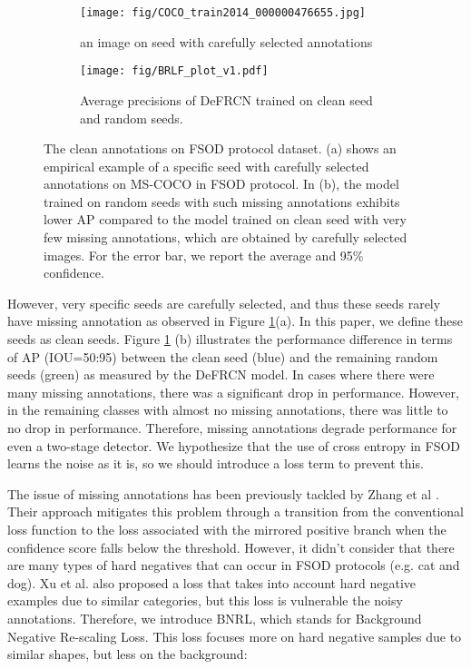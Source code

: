 \documentclass{article}
\begin{document}
\begin{figure}[ht]
    \centering
    \begin{subfigure}[]{0.45\textwidth}
    \texttt{[image: fig/COCO\_train2014\_000000476655.jpg]}
    \caption{an image on seed with carefully selected annotations}
    \end{subfigure}
    \begin{subfigure}[]{0.48\textwidth}
\texttt{[image: fig/BRLF\_plot\_v1.pdf]}
    \caption{Average precisions of DeFRCN trained on clean seed and random seeds.}
    \end{subfigure}
    \caption{
The clean annotations on FSOD protocol dataset. 
(a) shows an empirical example of a specific seed with carefully selected annotations on MS-COCO in FSOD protocol.
In (b), the model trained on random seeds with such missing annotations exhibits lower AP compared to the model trained on clean seed with very few missing annotations, which are obtained by carefully selected images. For the error bar, we report the average and 95\% confidence.}
\label{fig:negative sample2}
\end{figure}
    
However, very specific seeds are carefully selected, and thus these seeds rarely have missing annotation as observed in Figure \ref{fig:negative sample2}(a).
In this paper, we define these seeds as clean seeds.
Figure \ref{fig:negative sample2} (b) illustrates the performance difference in terms of AP (IOU=50:95) between the clean seed (blue) and the remaining random seeds (green) as measured by the DeFRCN model.
In cases where there were many missing annotations, there was a significant drop in performance. However, in the remaining classes with almost no missing annotations, there was little to no drop in performance.
Therefore, missing annotations degrade performance for even a two-stage detector.
We hypothesize that the use of cross entropy in FSOD learns the noise as it is, so we should introduce a loss term to prevent this.

The issue of missing annotations has been previously tackled by Zhang et al \cite{BRL}. 
Their approach mitigates this problem through a transition from the conventional loss function to the loss associated with the mirrored positive branch when the confidence score falls below the threshold.
However, it didn't consider that there are many types of hard negatives that can occur in FSOD protocols (e.g. cat and dog).
Xu et al. \cite{fssp} also proposed a loss that takes into account hard negative examples due to similar categories, but this loss is vulnerable the noisy annotations.
Therefore, we introduce BNRL, which stands for Background Negative Re-scaling Loss. This loss focuses more on hard negative samples due to similar shapes, but less on the background: 
\end{document}
